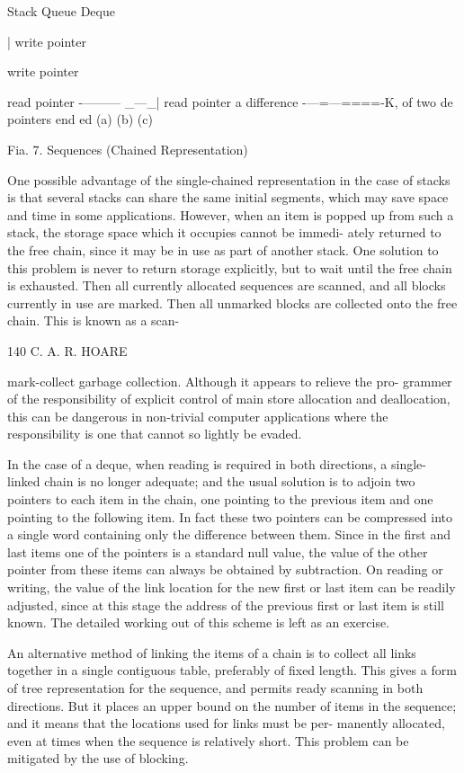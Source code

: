 {{{{				Stack Queue Deque
				
				| write pointer
				
				
				write pointer
				
				read pointer -——— _—_| read pointer a difference -—=—====-K, of two de pointers end ed (a) (b) (c)
				
				Fia. 7. Sequences (Chained Representation)
				
				One possible advantage of the single-chained representation in the case of stacks is that several stacks can share the same initial segments, which may save space and time in some applications. However, when an item is popped up from such a stack, the storage space which it occupies cannot be immedi- ately returned to the free chain, since it may be in use as part of another stack. One solution to this problem is never to return storage explicitly, but to wait until the free chain is exhausted. Then all currently allocated sequences are scanned, and all blocks currently in use are marked. Then all unmarked blocks are collected onto the free chain. This is known as a scan-
				
				140 C. A. R. HOARE
				
				mark-collect garbage collection. Although it appears to relieve the pro- grammer of the responsibility of explicit control of main store allocation and deallocation, this can be dangerous in non-trivial computer applications where the responsibility is one that cannot so lightly be evaded.
				
				In the case of a deque, when reading is required in both directions, a single- linked chain is no longer adequate; and the usual solution is to adjoin two pointers to each item in the chain, one pointing to the previous item and one pointing to the following item. In fact these two pointers can be compressed into a single word containing only the difference between them. Since in the first and last items one of the pointers is a standard null value, the value of the other pointer from these items can always be obtained by subtraction. On reading or writing, the value of the link location for the new first or last item can be readily adjusted, since at this stage the address of the previous first or last item is still known. The detailed working out of this scheme is left as an exercise.
				
				An alternative method of linking the items of a chain is to collect all links together in a single contiguous table, preferably of fixed length. This gives a form of tree representation for the sequence, and permits ready scanning in both directions. But it places an upper bound on the number of items in the sequence; and it means that the locations used for links must be per- manently allocated, even at times when the sequence is relatively short. This problem can be mitigated by the use of blocking.
				
}}}}
